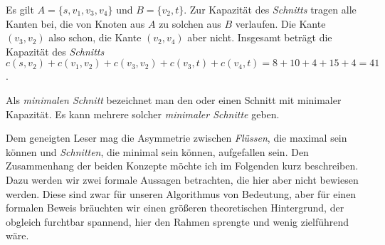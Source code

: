 \vspace{-8pt}
\begin{center}
\end{center}
\vspace{-8pt}

Es gilt $A = \{s, v_1, v_3, v_4\}$ und $B = \{v_2, t\}$. Zur Kapazität des \emph{Schnitts} tragen alle Kanten bei, die von Knoten aus $A$ zu solchen aus $B$ verlaufen. Die Kante $(v_3,v_2)$ also schon, die Kante $(v_2, v_4)$ aber nicht. Insgesamt beträgt die Kapazität des \emph{Schnitts} $c(s,v_2) + c(v_1, v_2) + c(v_3,v_2) + c(v_3,t) + c(v_4,t) = 8 + 10 + 4 + 15 + 4 = 41$.  

\begin{definition}
	Als \emph{minimalen Schnitt} bezeichnet man den oder einen Schnitt mit minimaler Kapazität. Es kann mehrere solcher \emph{minimaler Schnitte} geben. 
\end{definition}

Dem geneigten Leser mag die Asymmetrie zwischen \emph{Flüssen}, die maximal sein können und \emph{Schnitten}, die minimal sein können, aufgefallen sein. Den Zusammenhang der beiden Konzepte möchte ich im Folgenden kurz beschreiben. Dazu werden wir zwei formale Aussagen betrachten, die hier aber nicht bewiesen werden. Diese sind zwar für unseren Algorithmus von Bedeutung, aber für einen formalen Beweis bräuchten wir einen größeren theoretischen Hintergrund, der obgleich furchtbar spannend, hier den Rahmen sprengte und wenig zielführend wäre.

